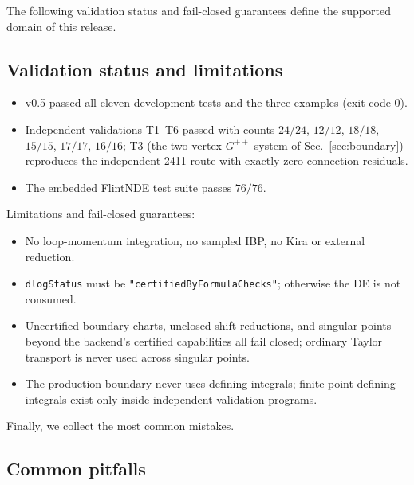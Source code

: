 \documentclass[11pt,a4paper]{article}
\begin{document}
The following validation status and fail-closed guarantees define the supported domain of this
release.

\subsection{Validation status and limitations}
\label{sec:validation}

\begin{itemize}
  \item v0.5 passed all eleven development tests and the three examples (exit code $0$).
  \item Independent validations T1--T6 passed with counts $24/24$, $12/12$, $18/18$, $15/15$,
        $17/17$, $16/16$; T3 (the two-vertex $G^{++}$ system of Sec.~\ref{sec:boundary})
        reproduces the independent 2411 route with exactly zero connection residuals.
  \item The embedded FlintNDE test suite passes $76/76$.
\end{itemize}
Limitations and fail-closed guarantees:
\begin{itemize}
  \item No loop-momentum integration, no sampled IBP, no Kira or external reduction.
  \item \texttt{dlogStatus} must be \texttt{"certifiedByFormulaChecks"}; otherwise the DE is not
        consumed.
  \item Uncertified boundary charts, unclosed shift reductions, and singular points beyond the
        backend's certified capabilities all fail closed; ordinary Taylor transport is never used
        across singular points.
  \item The production boundary never uses defining integrals; finite-point defining integrals
        exist only inside independent validation programs.
\end{itemize}

Finally, we collect the most common mistakes.

\subsection{Common pitfalls}
\label{sec:pitfalls}
\end{document}
